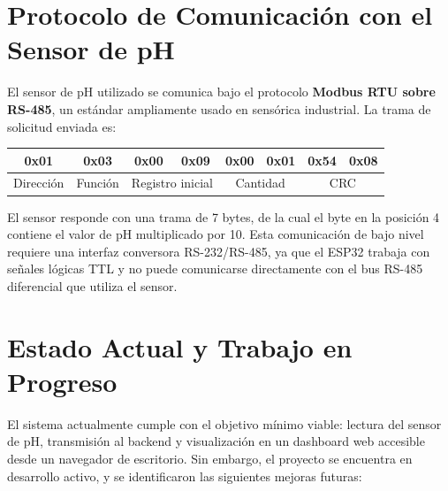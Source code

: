 \documentclass[11pt,a4paper]{article}
\begin{document}
\section{Protocolo de Comunicación con el Sensor de pH}

El sensor de pH utilizado se comunica bajo el protocolo
\textbf{Modbus RTU sobre RS-485}, un estándar ampliamente usado en
sensórica industrial. La trama de solicitud enviada es:

\begin{center}
\begin{tabular}{@{}cccccccc@{}}
\toprule
0x01 & 0x03 & 0x00 & 0x09 & 0x00 & 0x01 & 0x54 & 0x08 \\
\midrule
Dirección & Función & \multicolumn{2}{c}{Registro inicial} &
\multicolumn{2}{c}{Cantidad} & \multicolumn{2}{c}{CRC} \\
\bottomrule
\end{tabular}
\end{center}

El sensor responde con una trama de 7 bytes, de la cual el byte en
la posición 4 contiene el valor de pH multiplicado por 10. Esta
comunicación de bajo nivel requiere una interfaz conversora
RS-232/RS-485, ya que el ESP32 trabaja con señales lógicas TTL y no
puede comunicarse directamente con el bus RS-485 diferencial que
utiliza el sensor.

\section{Estado Actual y Trabajo en Progreso}

El sistema actualmente cumple con el objetivo mínimo viable: lectura
del sensor de pH, transmisión al backend y visualización en un
dashboard web accesible desde un navegador de escritorio. Sin
embargo, el proyecto se encuentra en desarrollo activo, y se
identificaron las siguientes mejoras futuras:
\end{document}
